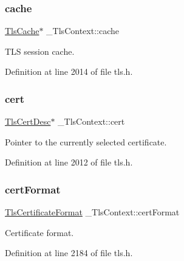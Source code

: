 \subsubsection{\texorpdfstring{cache}{cache}}
{\footnotesize\ttfamily \hyperlink{structTlsCache}{Tls\+Cache}$\ast$ \+\_\+\+Tls\+Context\+::cache}



T\+LS session cache. 



Definition at line 2014 of file tls.\+h.

\mbox{\label{struct__TlsContext_a2146ec05ade26ebba710d48057060f5e}} 
\subsubsection{\texorpdfstring{cert}{cert}}
{\footnotesize\ttfamily \hyperlink{structTlsCertDesc}{Tls\+Cert\+Desc}$\ast$ \+\_\+\+Tls\+Context\+::cert}



Pointer to the currently selected certificate. 



Definition at line 2012 of file tls.\+h.

\mbox{\label{struct__TlsContext_a72ea4936f53b890f0eabd14dca0b8d5b}} 
\subsubsection{\texorpdfstring{cert\+Format}{certFormat}}
{\footnotesize\ttfamily \hyperlink{tls_8h_a14c2a51c1d8cf969aa455b69e405c0d0}{Tls\+Certificate\+Format} \+\_\+\+Tls\+Context\+::cert\+Format}



Certificate format. 



Definition at line 2184 of file tls.\+h.

\mbox{\label{struct__TlsContext_a260ab9cc7c97883a4506db9fc0067aef}} 
